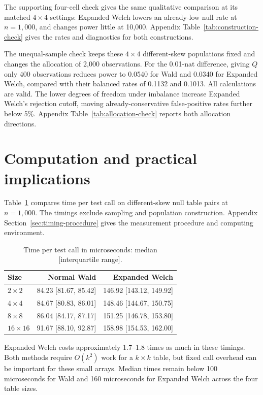 The supporting four-cell check gives the same qualitative comparison
at its matched \(4\times4\) settings: Expanded Welch lowers an
already-low null rate at \(n=1{,}000\), and changes power little
at 10,000. Appendix Table~\ref{tab:construction-check} gives the
rates and diagnostics for both constructions.

The unequal-sample check keeps these \(4\times4\) different-skew
populations fixed and changes the allocation of 2,000 observations.
For the 0.01-nat difference, giving \(Q\) only 400 observations reduces power to
0.0540 for Wald and 0.0340 for Expanded Welch, compared with their
balanced rates of 0.1132 and 0.1013.
All calculations are valid. The lower degrees of freedom under imbalance
increase Expanded Welch's rejection cutoff, moving already-conservative
false-positive rates further below 5\%. Appendix
Table~\ref{tab:allocation-check} reports both allocation directions.

\section{Computation and practical implications}

Table~\ref{tab:focused-runtime} compares time per test call on
different-skew null table pairs at \(n=1{,}000\). The timings exclude
sampling and population construction. Appendix
Section~\ref{sec:timing-procedure} gives the measurement procedure and
computing environment.

\begin{table}[htbp]
\centering
\caption{Time per test call in microseconds: median [interquartile range].}
\label{tab:focused-runtime}
\begin{tabular}{@{}lrr@{}}
\toprule
Size & Normal Wald & Expanded Welch\\
\midrule
\(2\times2\) & 84.23 [81.67, 85.42] & 146.92 [143.12, 149.92]\\
\(4\times4\) & 84.67 [80.83, 86.01] & 148.46 [144.67, 150.75]\\
\(8\times8\) & 86.04 [84.17, 87.17] & 151.25 [146.78, 153.80]\\
\(16\times16\) & 91.67 [88.10, 92.87] & 158.98 [154.53, 162.00]\\
\bottomrule
\end{tabular}
\end{table}

Expanded Welch costs approximately 1.7--1.8 times as much in these timings.
Both methods require \(O(k^2)\) work for a \(k\times k\) table, but
fixed call overhead can be important for these small arrays. Median
times remain below 100 microseconds for Wald and 160 microseconds for
Expanded Welch across the four table sizes.

